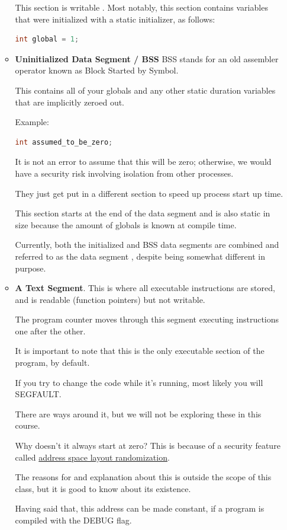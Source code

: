 \begin{itemize}
\begin{itemize}
          This section is writable \cite[P. 124]{van1994expert}.
          Most notably, this section contains variables that were initialized with a static initializer, as follows:

\begin{lstlisting}[language=C]
int global = 1;
\end{lstlisting}

    \item \textbf{Uninitialized Data Segment / BSS}
          BSS stands for an old assembler operator known as Block Started by Symbol.

          This contains all of your globals and any other static duration variables that are implicitly zeroed out.

          Example:
\begin{lstlisting}[language=C]
int assumed_to_be_zero;
\end{lstlisting}

          It is not an error to assume that this will be zero; otherwise, we would have a security risk involving isolation from other processes.

          They just get put in a different section to speed up process start up time.

          This section starts at the end of the data segment and is also static in size because the amount of globals is known at compile time.
          
          Currently, both the initialized and BSS data segments are combined and referred to as the data segment \cite[P. 124]{van1994expert}, despite being somewhat different in purpose.

    \item \textbf{A Text Segment}.
          This is where all executable instructions are stored, and is readable (function pointers) but not writable.

          The program counter moves through this segment executing instructions one after the other.

          It is important to note that this is the only executable section of the program, by default.

          If you try to change the code while it's running, most likely you will SEGFAULT.

          There are ways around it, but we will not be exploring these in this course.

          Why doesn't it always start at zero?
          This is because of a security feature called \href{https://en.wikipedia.org/wiki/Address_space_layout_randomization}{address space layout randomization}.

          The reasons for and explanation about this is outside the scope of this class, but it is good to know about its existence.

          Having said that, this address can be made constant, if a program is compiled with the DEBUG flag.
\end{itemize}
\end{itemize}



